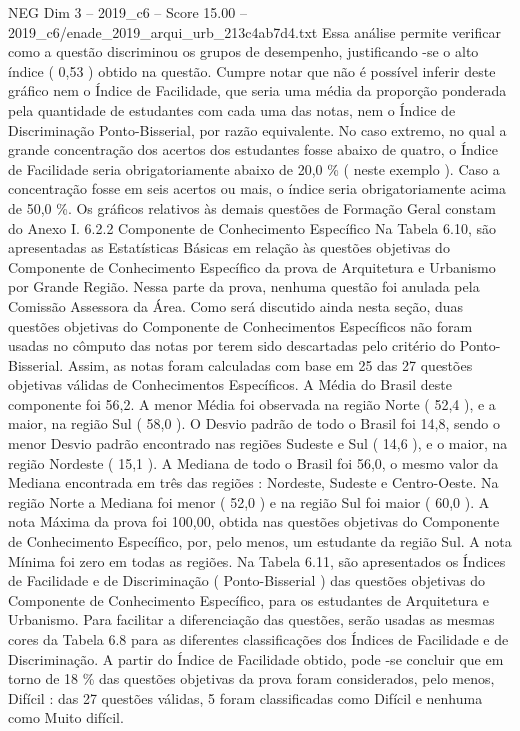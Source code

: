 \begin{textsample}{NEG Dim 3 – 2019\_c6 – Score 15.00 – 2019\_c6/enade\_2019\_arqui\_urb\_213c4ab7d4.txt}
Essa análise permite verificar como a questão discriminou os grupos de desempenho, justificando -se o alto índice ( 0,53 ) obtido na questão.
Cumpre notar que não é possível inferir deste gráfico nem o Índice de Facilidade, que seria uma média da proporção ponderada pela quantidade de estudantes com cada uma das notas, nem o Índice de Discriminação Ponto-Bisserial, por razão equivalente.
No caso extremo, no qual a grande concentração dos acertos dos estudantes fosse abaixo de quatro, o Índice de Facilidade seria obrigatoriamente abaixo de 20,0 \% ( neste exemplo ).
Caso a concentração fosse em seis acertos ou mais, o índice seria obrigatoriamente acima de 50,0 \%.
Os gráficos relativos às demais questões de Formação Geral constam do Anexo I. 6.2.2 Componente de Conhecimento Específico Na Tabela 6.10, são apresentadas as Estatísticas Básicas em relação às questões objetivas do Componente de Conhecimento Específico da prova de Arquitetura e Urbanismo por Grande Região.
Nessa parte da prova, nenhuma questão foi anulada pela Comissão Assessora da Área.
Como será discutido ainda nesta seção, duas questões objetivas do Componente de Conhecimentos Específicos não foram usadas no cômputo das notas por terem sido descartadas pelo critério do Ponto-Bisserial.
Assim, as notas foram calculadas com base em 25 das 27 questões objetivas válidas de Conhecimentos Específicos.
A Média do Brasil deste componente foi 56,2.
A menor Média foi observada na região Norte ( 52,4 ), e a maior, na região Sul ( 58,0 ).
O Desvio padrão de todo o Brasil foi 14,8, sendo o menor Desvio padrão encontrado nas regiões Sudeste e Sul ( 14,6 ), e o maior, na região Nordeste ( 15,1 ).
A Mediana de todo o Brasil foi 56,0, o mesmo valor da Mediana encontrada em três das regiões : Nordeste, Sudeste e Centro-Oeste.
Na região Norte a Mediana foi menor ( 52,0 ) e na região Sul foi maior ( 60,0 ).
A nota Máxima da prova foi 100,00, obtida nas questões objetivas do Componente de Conhecimento Específico, por, pelo menos, um estudante da região Sul.
A nota Mínima foi zero em todas as regiões.
Na Tabela 6.11, são apresentados os Índices de Facilidade e de Discriminação ( Ponto-Bisserial ) das questões objetivas do Componente de Conhecimento Específico, para os estudantes de Arquitetura e Urbanismo.
Para facilitar a diferenciação das questões, serão usadas as mesmas cores da Tabela 6.8 para as diferentes classificações dos Índices de Facilidade e de Discriminação.
A partir do Índice de Facilidade obtido, pode -se concluir que em torno de 18 \% das questões objetivas da prova foram considerados, pelo menos, Difícil : das 27 questões válidas, 5 foram classificadas como Difícil e nenhuma como Muito difícil.

\end{textsample}

